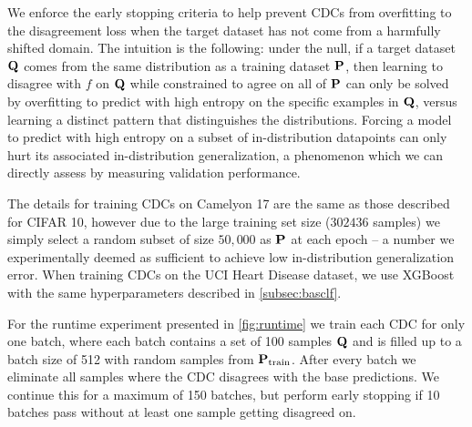 We enforce the early stopping criteria to help prevent CDCs from overfitting to the disagreement loss when the target dataset has not come from a harmfully shifted domain.
The intuition is the following: under the null, if a target dataset $\mathbf{Q}$ comes from the same distribution as a training dataset $\mathbf{P}$, then learning to disagree with $f$ on $\mathbf{Q}$ while constrained to agree on all of $\mathbf{P}$ can only be solved by overfitting to predict with high entropy on the specific examples in $\mathbf{Q}$, versus learning a distinct pattern that distinguishes the distributions.
Forcing a model to predict with high entropy on a subset of in-distribution datapoints can only hurt its associated in-distribution generalization, a phenomenon which we can directly assess by measuring validation performance.

The details for training CDCs on Camelyon 17 are the same as those described for CIFAR 10, however due to the large training set size ($302436$ samples) we simply select a random subset of size $50,000$ as $\mathbf{P}$ at each epoch -- a number we experimentally deemed as sufficient to achieve low in-distribution generalization error.
When training CDCs on the UCI Heart Disease dataset, we use XGBoost~\citep{xgb} with the same hyperparameters described in \autoref{subsec:basclf}.

For the runtime experiment presented in \autoref{fig:runtime} we train each CDC for only one batch, where each batch contains a set of 100 samples $\mathbf{Q}$ and is filled up to a batch size of 512 with random samples from $\mathbf{P}_{\text{train}}$. After every batch we eliminate all samples where the CDC disagrees with the base predictions.
We continue this for a maximum of 150 batches, but perform early stopping if 10 batches pass without at least one sample getting disagreed on.

